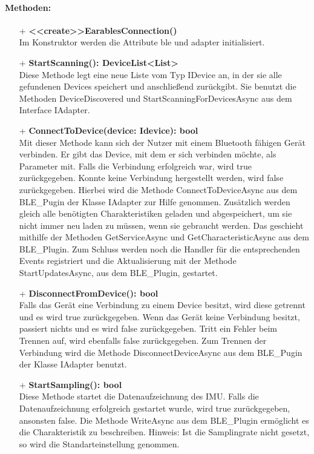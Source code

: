 \documentclass[a4paper,12pt]{article}
\begin{document}
\paragraph{Methoden:}
\begin{itemize}
	\item[+] \textbf{<<create>>\Gls{Earables}Connection()}\\ Im Konstruktor werden die Attribute ble und adapter initialisiert.
	\item[+] \textbf{StartScanning(): DeviceList<List>}\\ Diese Methode legt eine neue Liste vom Typ IDevice an, in der sie alle gefundenen Devices speichert und anschließend zurückgibt. Sie benutzt die Methoden DeviceDiscovered und StartScanningForDevicesAsync aus dem Interface IAdapter.
	\item[+] \textbf{ConnectToDevice(device: Idevice): bool}\\ Mit dieser Methode kann sich der Nutzer mit einem Bluetooth fähigen Gerät verbinden. Er gibt das Device, mit dem er sich verbinden möchte, als Parameter mit. Falls die Verbindung erfolgreich war, wird true zurückgegeben. Konnte keine Verbindung hergestellt werden, wird false zurückgegeben. Hierbei wird die Methode ConnectToDeviceAsync aus dem BLE\_Pugin der Klasse IAdapter zur Hilfe genommen. Zusätzlich werden gleich alle benötigten Charakteristiken geladen und abgespeichert, um sie nicht immer neu laden zu müssen, wenn sie gebraucht werden. Das geschieht mithilfe der Methoden GetServiceAsync und GetCharacteristicAsync aus dem BLE\_Plugin. Zum Schluss werden noch die Handler für die entsprechenden Events registriert und die Aktualisierung mit der Methode StartUpdatesAsync, aus dem BLE\_Plugin, gestartet.
	\item[+] \textbf{DisconnectFromDevice(): bool}\\ Falls das Gerät eine Verbindung zu einem Device besitzt, wird diese getrennt und es wird true zurückgegeben. Wenn das Gerät keine Verbindung besitzt, passiert nichts und es wird false zurückgegeben. Tritt ein Fehler beim Trennen auf, wird ebenfalls false zurückgegeben. Zum Trennen der Verbindung wird die Methode DisconnectDeviceAsync aus dem BLE\_Pugin der Klasse IAdapter benutzt.
	\item[+] \textbf{StartSampling(): bool}\\ Diese Methode startet die Datenaufzeichnung des IMU. Falls die Datenaufzeichnung erfolgreich gestartet wurde, wird true zurückgegeben, ansonsten false. Die Methode WriteAsync aus dem BLE\_Plugin ermöglicht es die Charakteristik zu beschreiben. Hinweis: Ist die Samplingrate nicht gesetzt, so wird die Standarteinstellung genommen.

\end{itemize}
\end{document}
